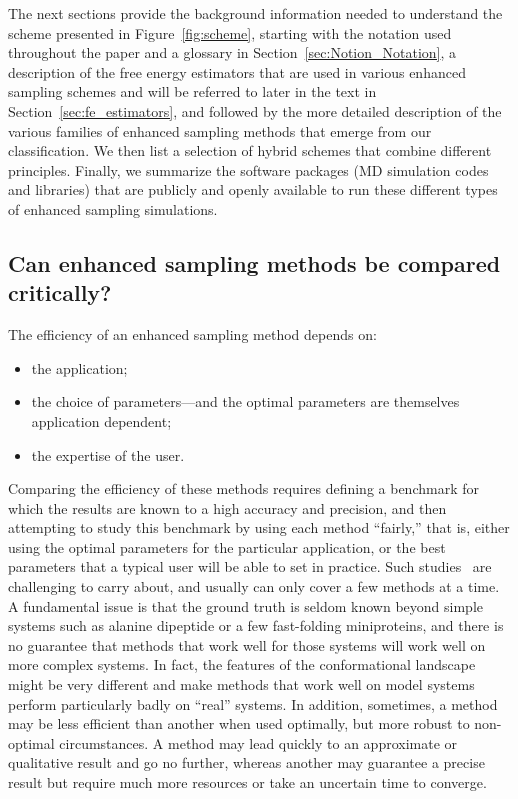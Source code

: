 \documentclass[9pt,review]{livecoms}
\begin{document}
The next sections provide the background information needed to understand the scheme presented in Figure~\ref{fig:scheme}, starting with the notation used throughout the paper and a glossary in Section~\ref{sec:Notion_Notation}, a description of the free energy estimators that are used in various enhanced sampling schemes and will be referred to later in the text in Section~\ref{sec:fe_estimators}, and followed by the more detailed description of the various families of enhanced sampling methods that emerge from our classification. We then list a selection of hybrid schemes that combine different principles. Finally, we summarize the software packages (MD simulation codes and libraries) that are publicly and openly available to run these different types of enhanced sampling simulations.


\subsection{Can enhanced sampling methods be compared critically?}
\label{sec:critical_comparison}

The efficiency of an enhanced sampling method depends on:
\begin{itemize}
 \item the application;
 \item the choice of parameters---and the optimal parameters are themselves application dependent;
 \item the expertise of the user.
\end{itemize}

Comparing the efficiency of these methods requires defining a benchmark for which the results are known to a high accuracy and precision, and then attempting to study this benchmark by using each method ``fairly,'' that is, either using the optimal parameters for the particular application, or the best parameters that a typical user will be able to set in practice. Such studies~\cite{Rizzi:JCAMD:2020a,Hrustak:JCP:2018} are challenging to carry about, and usually can only cover a few methods at a time.  A fundamental issue is that the ground truth is seldom known beyond simple systems such as alanine dipeptide or a few fast-folding miniproteins, and there is no guarantee that methods that work well for those systems will work well on more complex systems. In fact, the features of the conformational landscape might be very different and make methods that work well on model systems perform particularly badly on ``real'' systems. In addition, sometimes, a method may be less efficient than another when used optimally, but more robust to non-optimal circumstances.
A method may lead quickly to an approximate or qualitative result and go no further, whereas another may guarantee a precise result but require much more resources or take an uncertain time to converge.
\end{document}
